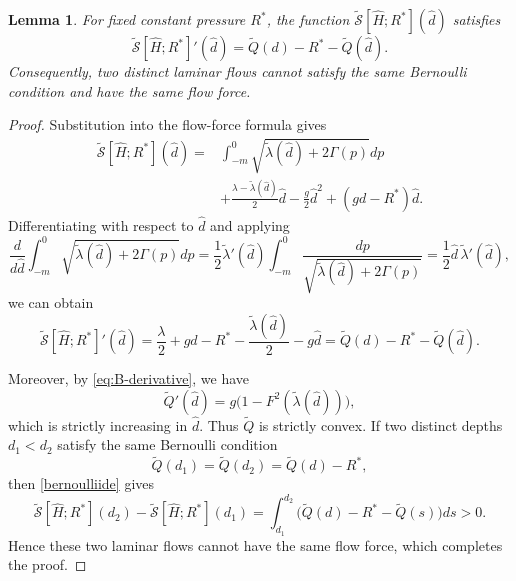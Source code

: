 \documentclass[12pt,letterpaper]{amsart}
\newtheorem{lemma}[theorem]{Lemma}
\numberwithin{equation}{section}
\begin{document}
\begin{lemma}\label{lemma:no bore}
	For fixed constant pressure $R^*$, the function
	$\tilde{\mathscr S}[\hat H;R^*](\hat d)$ satisfies
	\begin{equation}\label{bernoulliide}
		\tilde{\mathscr S}[\hat H;R^*]'(\hat d)
		=\tilde Q(d)-R^*-\tilde Q(\hat d).
	\end{equation}
	{Consequently, two distinct laminar flows cannot satisfy the same Bernoulli condition and have the same flow force.}
\end{lemma}
\begin{proof}
	{Substitution into the flow-force formula gives}
	\begin{equation*}
		\begin{aligned}
			\tilde{\mathscr S}[\hat H;R^*](\hat d)
			={}&\int_{-m}^0\sqrt{\tilde\lambda(\hat d)+2\Gamma(p)}dp\\
			&+\frac{\lambda-\tilde\lambda(\hat d)}{2}\hat d
			-\frac{g}{2}\hat d^2+(gd-R^*)\hat d.
		\end{aligned}
	\end{equation*}
	Differentiating with respect to $\hat d$ and applying
	\begin{equation*}
		\frac{d}{d\hat d}
		\int_{-m}^0\sqrt{\tilde\lambda(\hat d)+2\Gamma(p)}dp
		=\frac12\tilde\lambda'(\hat d)
		\int_{-m}^0\frac{dp}{\sqrt{\tilde\lambda(\hat d)+2\Gamma(p)}}
		=\frac12\hat d\,\tilde\lambda'(\hat d),
	\end{equation*}
	we can obtain
	\begin{equation*}
		\tilde{\mathscr S}[\hat H;R^*]'(\hat d)
		=\frac{\lambda}{2}+gd-R^*
		-\frac{\tilde\lambda(\hat d)}{2}-g\hat d
		=\tilde Q(d)-R^*-\tilde Q(\hat d).
	\end{equation*}
	
	Moreover, by \eqref{eq:B-derivative}, we have
	\begin{equation*}
		\tilde Q'(\hat d)
		=g\bigl(1-F^2(\tilde\lambda(\hat d))\bigr),
	\end{equation*}
	which is strictly increasing in $\hat d$. Thus $\tilde Q$ is strictly convex. If two distinct depths $d_1<d_2$ satisfy the same Bernoulli condition
	\begin{equation*}
		\tilde Q(d_1)=\tilde Q(d_2)=\tilde Q(d)-R^*,
	\end{equation*}
	then \eqref{bernoulliide} gives
	\begin{equation*}
		\tilde{\mathscr S}[\hat H;R^*](d_2)
		-\tilde{\mathscr S}[\hat H;R^*](d_1)
		=\int_{d_1}^{d_2}
		\bigl(\tilde Q(d)-R^*-\tilde Q(s)\bigr)ds>0.
	\end{equation*}
	Hence these two laminar flows cannot have the same flow force, which completes the proof.
\end{proof}
\end{document}

